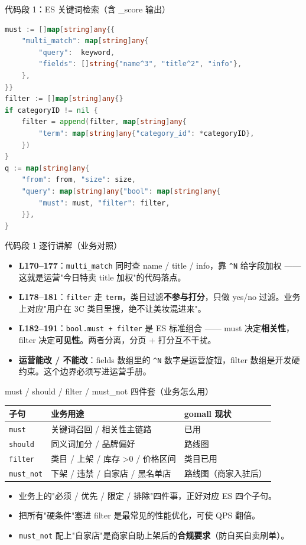 \documentclass[aspectratio=169,11pt]{beamer}
\begin{document}
\begin{frame}{代码段 1：ES 关键词检索（含 \_score 输出）}
\begin{lstlisting}[language=Go,firstnumber=170,basicstyle=\ttfamily\tiny]
must := []map[string]any{{
    "multi_match": map[string]any{
        "query":  keyword,
        "fields": []string{"name^3", "title^2", "info"},
    },
}}
filter := []map[string]any{}
if categoryID != nil {
    filter = append(filter, map[string]any{
        "term": map[string]any{"category_id": *categoryID},
    })
}
q := map[string]any{
    "from": from, "size": size,
    "query": map[string]any{"bool": map[string]any{
        "must": must, "filter": filter,
    }},
}
\end{lstlisting}
\end{frame}

\begin{frame}[shrink]{代码段 1 逐行讲解（业务对照）}
\begin{itemize}
  \item \textbf{L170--177}：\texttt{multi\_match} 同时查 name / title / info，靠 \texttt{\^{}N} 给字段加权 —— 这就是运营"今日特卖 title 加权"的代码落点。
  \item \textbf{L178--181}：\texttt{filter} 走 \texttt{term}，类目过滤\textbf{不参与打分}，只做 yes/no 过滤。业务上对应"用户在 3C 类目里搜，绝不让美妆混进来"。
  \item \textbf{L182--191}：\texttt{bool.must + filter} 是 ES 标准组合 —— must 决定\textbf{相关性}，filter 决定\textbf{可见性}。两者分离，分页 + 打分互不干扰。
  \item \textbf{运营能改 / 不能改}：fields 数组里的 \texttt{\^{}N} 数字是运营旋钮，filter 数组是开发硬约束。这个边界必须写进运营手册。
\end{itemize}
\end{frame}

\begin{frame}[shrink]{must / should / filter / must\_not 四件套（业务怎么用）}
\begin{tabular}{@{}lll@{}}
\toprule
子句         & 业务用途                        & gomall 现状     \\
\midrule
\texttt{must}    & 关键词召回 / 相关性主链路       & 已用            \\
\texttt{should}  & 同义词加分 / 品牌偏好           & 路线图           \\
\texttt{filter}  & 类目 / 上架 / 库存 \textgreater 0 / 价格区间 & 类目已用       \\
\texttt{must\_not} & 下架 / 违禁 / 自家店 / 黑名单店  & 路线图（商家入驻后）\\
\bottomrule
\end{tabular}
\vspace{2mm}
\begin{itemize}
  \item 业务上的"必须 / 优先 / 限定 / 排除"四件事，正好对应 ES 四个子句。
  \item 把所有"硬条件"塞进 filter 是最常见的性能优化，可使 QPS 翻倍。
  \item \texttt{must\_not} 配上"自家店"是商家自助上架后的\textbf{合规要求}（防自买自卖刷单）。
\end{itemize}
\end{frame}
\end{document}
